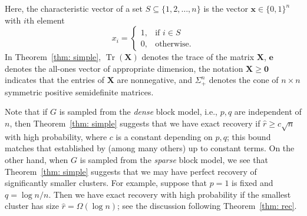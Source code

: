 \documentclass[twoside,11pt]{article}
\newcommand{\R}{\mathbf{R}}
\DeclareMathOperator{\tr}{{Tr}}
\newcommand{\e}{\bs {e}}
\newcommand{\bs}{\boldsymbol}
\newcommand{\x}{\bs {x}}
\newcommand{\X}{\bs {X}}
\newcommand{\0}{\bs{0}}
\newcommand{\branchdef}[1] {\ensuremath{ \left\{\begin{array}{rl} #1 \end{array} \right. }} %
\begin{document}
Here, the characteristic vector of a set
\(S \subseteq \{1,2,\dots, n\}\) is the vector \( \x \in \{0,1\}^n \) %
with \(i\)th element
\[
x_i = \branchdef{ 1, & \mbox{if } i \in S \\ 0, &\mbox{otherwise.}}
\]
In Theorem~\ref{thm: simple}, \(\tr(\X) \) denotes the trace of the matrix \(\X\),
\(\e\) denotes the all-ones vector of appropriate dimension,
the notation \(\X \ge \0\) indicates that the entries of \(\X\) are nonnegative,
and \(\Sigma_+^n\) denotes the cone of \(n\times n\) symmetric positive semidefinite matrices.

Note that if \(G\) is sampled from the \emph{dense} block model, i.e., \(p,q\) are independent of \(n\), then Theorem~\ref{thm: simple} suggests that we have exact recovery if \( \hat r \ge c \sqrt{n}\) with high probability, where \(c\) is a constant
depending on \(p, q\); this bound matches that established by \cite{ames2014guaranteed} (among many others) up to
constant terms.
On the other hand, when \(G\) is sampled from the \emph{sparse} block model,
we see that Theorem~\ref{thm: simple} suggests that we may have perfect recovery of significantly smaller clusters.
For example, suppose that \(p=1\) is fixed and \(q = \log n/ n\).
Then we have exact recovery with high probability if
the smallest cluster has size \(\hat r = \Omega( \log n)\);
see the discussion following Theorem~\ref{thm: rec}.


\end{document}
